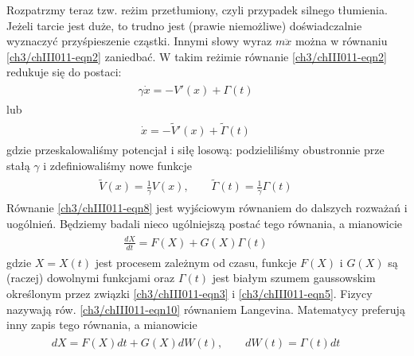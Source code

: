 \documentclass[a4paper,12pt,polish]{sphinxmanual}
\begin{document}
Rozpatrzmy teraz tzw. reżim przetłumiony, czyli przypadek silnego tłumienia. Jeżeli tarcie jest duże, to trudno jest (prawie niemożliwe) doświadczalnie wyznaczyć przyśpieszenie cząstki. Innymi słowy wyraz $m \ddot x$ można w równaniu \eqref{ch3/chIII011-eqn2} zaniedbać. W takim reżimie równanie \eqref{ch3/chIII011-eqn2} redukuje się do postaci:
\label{ch3/chIII011:equation-eqn7}\begin{gather}
\begin{split} \gamma \dot x = -V'(x) + \Gamma (t) \qquad\end{split}\label{ch3/chIII011-eqn7}
\end{gather}
lub
\label{ch3/chIII011:equation-eqn8}\begin{gather}
\begin{split} \dot x = -\tilde V'(x) + \tilde \Gamma (t) \qquad\end{split}\label{ch3/chIII011-eqn8}
\end{gather}
gdzie przeskalowaliśmy potencjał i siłę losową: podzieliliśmy obustronnie prze stałą $\gamma$ i zdefiniowaliśmy nowe funkcje
\label{ch3/chIII011:equation-eqn9}\begin{gather}
\begin{split}\tilde V(x) = \frac{1}{\gamma} V(x), \qquad \tilde\Gamma (t) = \frac{1}{\gamma} \Gamma(t) \qquad\end{split}\label{ch3/chIII011-eqn9}
\end{gather}
Równanie \eqref{ch3/chIII011-eqn8} jest wyjściowym równaniem do dalszych rozważań i uogólnień. Będziemy badali nieco ugólniejszą postać tego równania, a mianowicie
\label{ch3/chIII011:equation-eqn10}\begin{gather}
\begin{split} \frac{dX}{dt} = F(X) + G(X) \Gamma (t) \qquad\end{split}\label{ch3/chIII011-eqn10}
\end{gather}
gdzie $X=X(t)$ jest procesem zależnym od czasu, funkcje $F(X)$ i $G(X)$ są (raczej) dowolnymi funkcjami oraz $\Gamma(t)$ jest białym szumem gaussowskim określonym przez związki \eqref{ch3/chIII011-eqn3} i \eqref{ch3/chIII011-eqn5}. Fizycy nazywają rów. \eqref{ch3/chIII011-eqn10} równaniem Langevina. Matematycy preferują inny zapis tego równania, a mianowicie
\label{ch3/chIII011:equation-eqn11}\begin{gather}
\begin{split} dX = F(X) dt + G(X) dW(t), \qquad dW(t) = \Gamma(t) dt \qquad\end{split}\label{ch3/chIII011-eqn11}
\end{gather}
\end{document}
